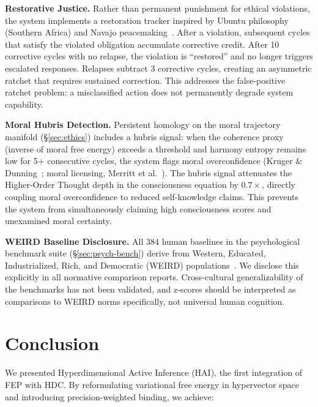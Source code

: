 \documentclass[10pt,letterpaper]{article}
\begin{document}
\textbf{Restorative Justice.}
Rather than permanent punishment for ethical violations, the system implements a restoration tracker inspired by Ubuntu philosophy (Southern Africa) and Navajo peacemaking~\cite{yazzie1994navajo}. After a violation, subsequent cycles that satisfy the violated obligation accumulate corrective credit. After 10 corrective cycles with no relapse, the violation is ``restored'' and no longer triggers escalated responses. Relapses subtract 3 corrective cycles, creating an asymmetric ratchet that requires sustained correction. This addresses the false-positive ratchet problem: a misclassified action does not permanently degrade system capability.

\textbf{Moral Hubris Detection.}
Persistent homology on the moral trajectory manifold (\S\ref{sec:ethics}) includes a hubris signal: when the coherence proxy (inverse of moral free energy) exceeds a threshold and harmony entropy remains low for 5+ consecutive cycles, the system flags moral overconfidence (Kruger \& Dunning~\cite{kruger1999unskilled}; moral licensing, Merritt et al.~\cite{merritt2010moral}). The hubris signal attenuates the Higher-Order Thought depth in the consciousness equation by $0.7\times$, directly coupling moral overconfidence to reduced self-knowledge claims. This prevents the system from simultaneously claiming high consciousness scores and unexamined moral certainty.

\textbf{WEIRD Baseline Disclosure.}
All 384 human baselines in the psychological benchmark suite (\S\ref{sec:psych-bench}) derive from Western, Educated, Industrialized, Rich, and Democratic (WEIRD) populations~\cite{henrich2010weirdest}. We disclose this explicitly in all normative comparison reports. Cross-cultural generalizability of the benchmarks has not been validated, and z-scores should be interpreted as comparisons to WEIRD norms specifically, not universal human cognition.


\section{Conclusion}

We presented Hyperdimensional Active Inference (HAI), the first integration of FEP with HDC. By reformulating variational free energy in hypervector space and introducing precision-weighted binding, we achieve:
\end{document}
